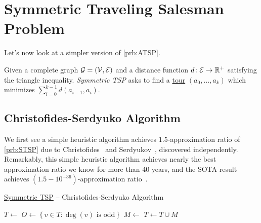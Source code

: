 \section{Symmetric Traveling Salesman Problem}
Let's now look at a simpler version of \autoref{prb:ATSP}.

\begin{problem}\label{prb:STSP}
Given a complete graph \(\mathcal{\MakeUppercase{g}} =(\mathcal{\MakeUppercase{v}} , \mathcal{\MakeUppercase{e}} )\) and a distance function \(d\colon \mathcal{\MakeUppercase{e}} \to \mathbb{\MakeUppercase{r}} ^+\) satisfying the triangle inequality. \emph{Symmetric TSP} asks to find a \hyperref[def:tour]{tour} \((a_0, \ldots , a_k)\) which minimizes \(\sum_{i=0} ^{k-1}d(a_{i-1}, a_i)\).
\end{problem}

\subsection{Christofides-Serdyuko Algorithm}
We first see a simple heuristic algorithm achieves \(1.5\)-approximation ratio of \autoref{prb:STSP} due to Christofides~\cite{Christofides2022WorstCaseAO} and Serdyukov~\cite{Anatoliy}, discovered independently. Remarkably, this simple heuristic algorithm achieves nearly the best approximation ratio we know for more than \(40\) years, and the SOTA result achieves \((1.5-10^{-36})\)-approximation ratio~\cite{10.1145/3406325.3451009}.

\begin{algorithm}[H]\label{algo:Christofides-Serdyuko}
	\DontPrintSemicolon
	\caption{\hyperref[prb:STSP]{Symmetric TSP} -- Christofides-Serdyuko Algorithm~\cite{Christofides2022WorstCaseAO,Anatoliy}}
	\BlankLine
	\(T \gets\)\label{algo:Christofides-Serdyuko-linea1}
	\(O\gets \left\{ v\in T \colon \deg(v)\text{ is odd}\right\} \)\label{algo:Christofides-Serdyuko-linea2}\;
	\(M\gets\)\label{algo:Christofides-Serdyuko-linea3}
	\(T\gets T \cup M\)\;
	\;
\end{algorithm}

